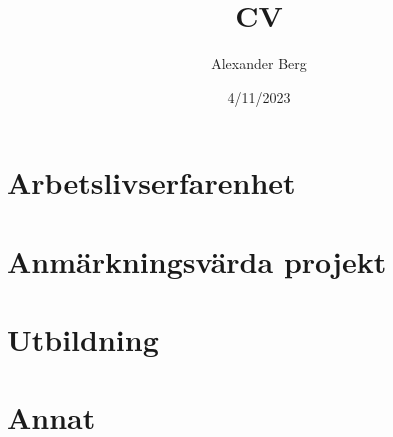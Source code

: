 \documentclass{Style}
\title{CV}
\author{Alexander Berg}
\date{4/11/2023}
\begin{document}


\section{Arbetslivserfarenhet}



\section{Anmärkningsvärda projekt}



\section{Utbildning}



\section{Annat}




\titlerule
\end{document}
